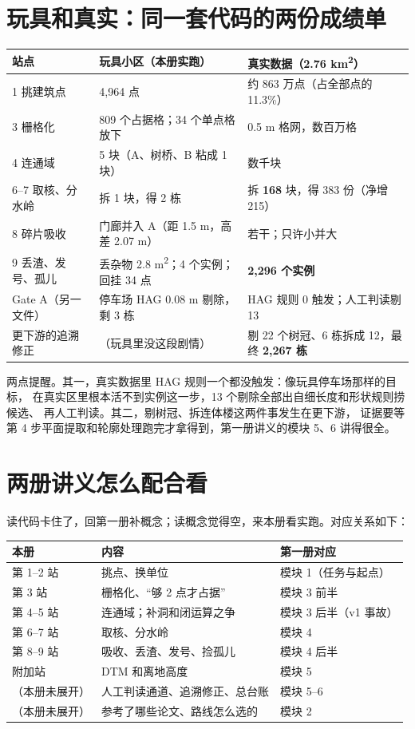 \documentclass[11pt]{ctexart}
\begin{document}
\section{玩具和真实：同一套代码的两份成绩单}

\begin{center}
\small
\begin{tabular}{lll}
\toprule
站点 & 玩具小区（本册实跑） & 真实数据（2.76 km\textsuperscript{2}） \\
\midrule
1 挑建筑点 & 4{,}964 点 & 约 863 万点（占全部点的 11.3\%） \\
3 栅格化 & 809 个占据格；34 个单点格放下 & 0.5 m 格网，数百万格 \\
4 连通域 & 5 块（A、树桥、B 粘成 1 块） & 数千块 \\
6--7 取核、分水岭 & 拆 1 块，得 2 栋 & 拆 \textbf{168} 块，得 383 份（净增 215） \\
8 碎片吸收 & 门廊并入 A（距 1.5 m，高差 2.07 m） & 若干；只许小并大 \\
9 丢渣、发号、孤儿 & 丢杂物 2.8 m\textsuperscript{2}；4 个实例；回挂 34 点 & \textbf{2{,}296 个实例} \\
Gate A（另一文件） & 停车场 HAG 0.08 m 剔除，剩 3 栋 & HAG 规则 0 触发；人工判读剔 13 \\
更下游的追溯修正 & （玩具里没这段剧情） & 剔 22 个树冠、6 栋拆成 12，最终 \textbf{2{,}267 栋} \\
\bottomrule
\end{tabular}
\end{center}

两点提醒。其一，真实数据里 HAG 规则一个都没触发：像玩具停车场那样的目标，
在真实区里根本活不到实例这一步，13 个剔除全部出自细长度和形状规则捞候选、
再人工判读。其二，剔树冠、拆连体楼这两件事发生在更下游，
证据要等第 4 步平面提取和轮廓处理跑完才拿得到，第一册讲义的模块 5、6 讲得很全。

\section{两册讲义怎么配合看}

读代码卡住了，回第一册补概念；读概念觉得空，来本册看实跑。对应关系如下：

\begin{center}
\small
\begin{tabular}{lll}
\toprule
本册 & 内容 & 第一册对应 \\
\midrule
第 1--2 站 & 挑点、换单位 & 模块 1（任务与起点） \\
第 3 站 & 栅格化、``够 2 点才占据'' & 模块 3 前半 \\
第 4--5 站 & 连通域；补洞和闭运算之争 & 模块 3 后半（v1 事故） \\
第 6--7 站 & 取核、分水岭 & 模块 4 \\
第 8--9 站 & 吸收、丢渣、发号、捡孤儿 & 模块 4 后半 \\
附加站 & DTM 和离地高度 & 模块 5 \\
（本册未展开） & 人工判读通道、追溯修正、总台账 & 模块 5--6 \\
（本册未展开） & 参考了哪些论文、路线怎么选的 & 模块 2 \\
\bottomrule
\end{tabular}
\end{center}
\end{document}
